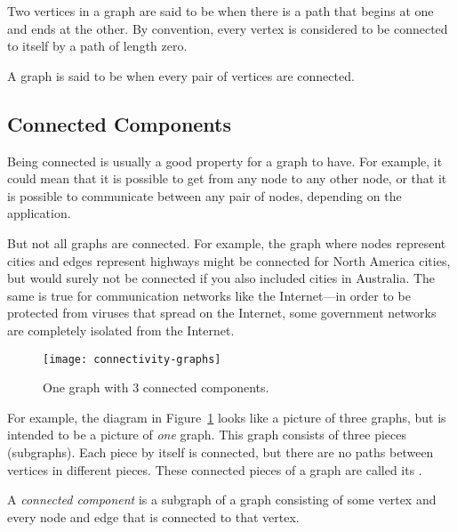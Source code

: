 \begin{definition}
  Two vertices in a graph are said to be  when there
  is a path that begins at one and ends at the other.  By convention,
  every vertex is considered to be connected to itself by a path of
  length zero.
\end{definition}

\begin{definition}\label{def:connected-graph}
A graph is said to be  when every pair of vertices are
connected.
\end{definition}

\subsection{Connected Components}

Being connected is usually a good property for a graph to have.  For
example, it could mean that it is possible to get from any node to any
other node, or that it is possible to communicate between any pair of
nodes, depending on the application.

But not all graphs are connected.  For example, the graph where nodes
represent cities and edges represent highways might be connected for
North America cities, but would surely not be connected if you also
included cities in Australia.  The same is true for communication
networks like the Internet---in order to be protected from viruses
that spread on the Internet, some government networks are completely
isolated from the Internet.

\begin{figure}[htbp]
\texttt{[image: connectivity-graphs]}
\caption{One graph with 3 connected components.}
\label{fig:3comp}
\end{figure}

For example, the diagram in Figure~\ref{fig:3comp} looks like a
picture of three graphs, but is intended to be a picture of \emph{one}
graph.  This graph consists of three pieces (subgraphs).  Each piece
by itself is connected, but there are no paths between vertices in
different pieces.  These connected pieces of a graph are called its
.

\begin{definition}\label{def:connected-component}
A \emph{connected component} is a subgraph of a graph consisting of
some vertex and every node and edge that is connected to that vertex.
\end{definition}

